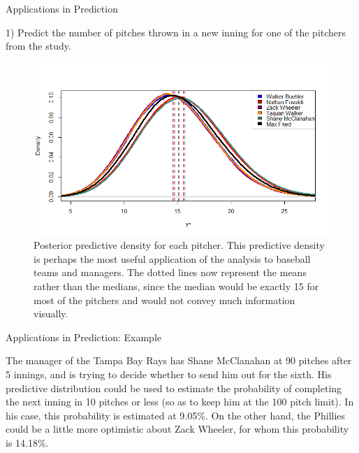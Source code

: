\documentclass[xcolor=dvipsnames]{beamer}
\begin{document}
\begin{frame}{Applications in Prediction}

1) Predict the number of pitches thrown in a new inning for one of the pitchers from the study.

\begin{figure}[h]
    \centering
    \includegraphics[scale=0.35]{figs/preds.png}
    \caption{Posterior predictive density for each pitcher. This predictive density is perhaps the most useful application of the analysis to baseball teams and managers. The dotted lines now represent the means rather than the medians, since the median would be exactly 15 for most of the pitchers and would not convey much information visually.}
    \label{fig:preds}
\end{figure}

\end{frame}


\begin{frame}{Applications in Prediction: Example}

The manager of the Tampa Bay Rays has Shane McClanahan at 90 pitches after 5 innings, and is trying to decide whether to send him out for the sixth. His predictive distribution could be used to estimate the probability of completing the next inning in 10 pitches or less (so as to keep him at the 100 pitch limit). In his case, this probability is estimated at 9.05\%. On the other hand, the Phillies could be a little more optimistic about Zack Wheeler, for whom this probability is 14.18\%.
    
\end{frame}

\end{document}
